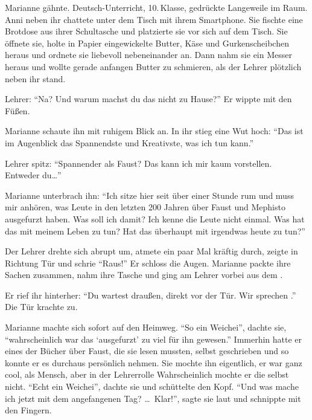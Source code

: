 \label{cha:2019_marianne}

Marianne gähnte. Deutsch-Unterricht, 10.\,Klasse, gedrückte Langeweile im Raum.
Anni neben ihr chattete unter dem Tisch mit ihrem Smartphone.
Sie  fischte eine Brotdose aus ihrer Schultasche und platzierte sie vor sich auf dem Tisch.
Sie öffnete sie, holte in Papier eingewickelte Butter, Käse und Gurkenscheibchen heraus und ordnete sie liebevoll nebeneinander an.
Dann nahm sie ein Messer heraus und wollte gerade anfangen Butter  zu schmieren, als der Lehrer plötzlich neben ihr stand.


Lehrer: \enquote{Na? Und warum machst du das nicht zu Hause?} Er wippte mit den Füßen.

Marianne schaute ihn mit ruhigem Blick an.
In ihr stieg eine Wut hoch: \enquote{Das ist im Augenblick das Spannendste und Kreativste, was ich tun kann.}

Lehrer spitz: \enquote{Spannender als Faust? Das kann ich mir kaum vorstellen.
Entweder du\dots}

Marianne unterbrach ihn: \enquote{Ich sitze hier seit über einer Stunde rum und muss mir anhören, was Leute in den letzten 200 Jahren über Faust und Mephisto  ausgefurzt haben.
Was soll ich damit? Ich kenne die Leute nicht einmal.
Was hat das mit meinem Leben zu tun? Hat das überhaupt mit irgendwas heute zu tun?} 

Der Lehrer drehte sich abrupt um, atmete ein paar Mal kräftig durch, zeigte in Richtung Tür und schrie \enquote{Raus!} Er schloss die Augen.
Marianne packte ihre Sachen zusammen, nahm ihre Tasche und ging am Lehrer vorbei aus dem .

Er rief ihr hinterher: \enquote{Du wartest draußen, direkt vor der Tür.
Wir sprechen .} Die Tür krachte zu.

Marianne machte sich sofort auf den Heimweg.
\enquote{So ein Weichei}, dachte sie, \enquote{wahrscheinlich war das \enquote{ausgefurzt} zu viel für ihn gewesen.} Immerhin hatte er eines der Bücher über Faust, die sie lesen mussten, selbst geschrieben und so konnte er es durchaus persönlich nehmen.
Sie mochte ihn eigentlich, er war  ganz cool, als Mensch, aber in der Lehrerrolle Wahrscheinlich mochte er die selbst nicht.
\enquote{Echt ein Weichei}, dachte sie und schüttelte den Kopf.
\enquote{Und was mache ich jetzt mit dem angefangenen Tag? \dots\
Klar!}, sagte sie laut und schnippte mit den Fingern.

